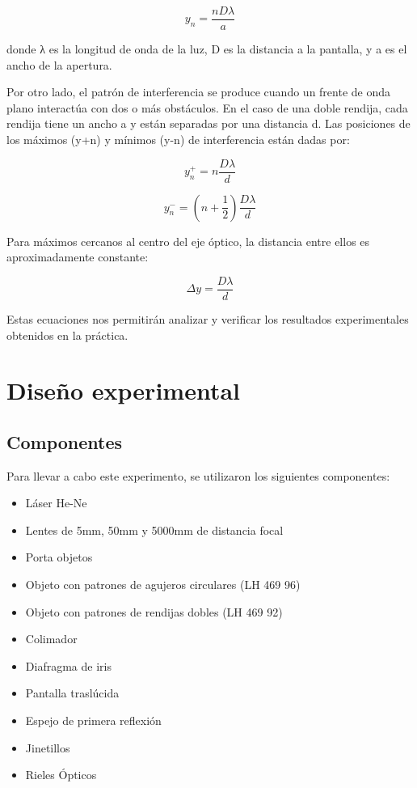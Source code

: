 \documentclass[twocolumn,a4paper,11pt]{scrartcl}
\begin{document}
\begin{equation}
y_n = \frac{nD\lambda}{a}
\end{equation}

donde λ es la longitud de onda de la luz, D es la distancia a la pantalla, y a es el ancho de la apertura.

Por otro lado, el patrón de interferencia se produce cuando un frente de onda plano interactúa con dos o más obstáculos. En el caso de una doble rendija, cada rendija tiene un ancho a y están separadas por una distancia d. Las posiciones de los máximos (y+n) y mínimos (y-n) de interferencia están dadas por:

\begin{equation}
y^+_n = n\frac{D\lambda}{d}
\end{equation}

\begin{equation}
y^-_n = (n + \frac{1}{2})\frac{D\lambda}{d}
\end{equation}

Para máximos cercanos al centro del eje óptico, la distancia entre ellos es aproximadamente constante:

\begin{equation}
\Delta y = \frac{D\lambda}{d}
\end{equation}

Estas ecuaciones nos permitirán analizar y verificar los resultados experimentales obtenidos en la práctica.

\section{Diseño experimental}

\subsection{Componentes}
Para llevar a cabo este experimento, se utilizaron los siguientes componentes:
\begin{itemize}
    \item Láser He-Ne
    \item Lentes de 5mm, 50mm y 5000mm de distancia focal
    \item Porta objetos
    \item Objeto con patrones de agujeros circulares (LH 469 96)
    \item Objeto con patrones de rendijas dobles (LH 469 92)
    \item Colimador
    \item Diafragma de iris
    \item Pantalla traslúcida
    \item Espejo de primera reflexión
    \item Jinetillos
    \item Rieles Ópticos
\end{itemize}
\end{document}
